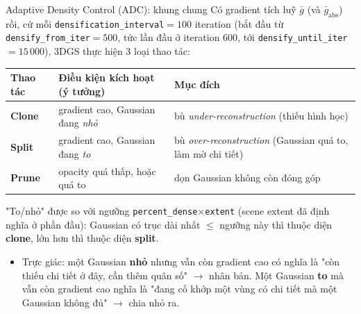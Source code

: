 \begin{frame}{Adaptive Density Control (ADC): khung chung}
\scriptsize
Có gradient tích luỹ $\bar g$ (và $\bar g_{\text{abs}}$) rồi, cứ mỗi \texttt{densification\_interval}$=100$ iteration
(bắt đầu từ \texttt{densify\_from\_iter}$=500$, tức lần đầu ở iteration $600$, tới \texttt{densify\_until\_iter}$=15\,000$),
3DGS thực hiện $3$ loại thao tác:
\begin{center}
\begin{tabular}{lll}
\toprule
\textbf{Thao tác} & \textbf{Điều kiện kích hoạt (ý tưởng)} & \textbf{Mục đích}\\
\midrule
\textbf{Clone} & gradient cao, Gaussian đang \emph{nhỏ} & bù \emph{under-reconstruction} (thiếu hình học)\\
\textbf{Split} & gradient cao, Gaussian đang \emph{to} & bù \emph{over-reconstruction} (Gaussian quá to, làm mờ chi tiết)\\
\textbf{Prune} & opacity quá thấp, hoặc quá to & dọn Gaussian không còn đóng góp\\
\bottomrule
\end{tabular}
\end{center}
"To/nhỏ" được so với ngưỡng \texttt{percent\_dense}$\times$\texttt{extent} (scene extent đã định nghĩa ở phần đầu):
Gaussian có trục dài nhất $\le$ ngưỡng này thì thuộc diện \textbf{clone}, lớn hơn thì thuộc diện \textbf{split}.
\begin{itemize}\itemsep1pt
    \item Trực giác: một Gaussian \textbf{nhỏ} nhưng vẫn còn gradient cao có nghĩa là "còn thiếu chi tiết ở đây, cần
    thêm quân số" $\to$ nhân bản. Một Gaussian \textbf{to} mà vẫn còn gradient cao nghĩa là "đang cố khớp một vùng có
    chi tiết mà một Gaussian không đủ" $\to$ chia nhỏ ra.
\end{itemize}
\end{frame}

